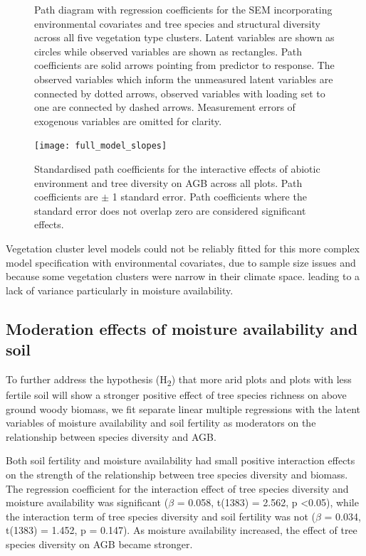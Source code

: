 \documentclass[11pt,a4paper]{article}
\begin{document}
\begin{figure}[H]
\centering
	
	\caption{Path diagram with regression coefficients for the SEM incorporating environmental covariates and tree species and structural diversity across all five vegetation type clusters. Latent variables are shown as circles while observed variables are shown as rectangles. Path coefficients are solid arrows pointing from predictor to response. The observed variables which inform the unmeasured latent variables are connected by dotted arrows, observed variables with loading set to one are connected by dashed arrows. Measurement errors of exogenous variables are omitted for clarity.}
	\label{full_mod}
\end{figure}

\begin{figure}[H]
\centering
	\texttt{[image: full\_model\_slopes]}
	\caption{Standardised path coefficients for the interactive effects of abiotic environment and tree diversity on AGB across all plots. Path coefficients are $\pm$ 1 standard error. Path coefficients where the standard error does not overlap zero are considered significant effects.}
	\label{full_model_slopes}
\end{figure}


Vegetation cluster level models could not be reliably fitted for this more complex model specification with environmental covariates, due to sample size issues and because some vegetation clusters were narrow in their climate space. leading to a lack of variance particularly in moisture availability.


\subsection{Moderation effects of moisture availability and soil}

To further address the hypothesis (H\textsubscript{2}) that more arid plots and plots with less fertile soil will show a stronger positive effect of tree species richness on above ground woody biomass, we fit separate linear multiple regressions with the latent variables of moisture availability and soil fertility as moderators on the relationship between species diversity and AGB.

Both soil fertility and moisture availability had small positive interaction effects on the strength of the relationship between tree species diversity and biomass. The regression coefficient for the interaction effect of tree species diversity and moisture availability was significant ($\beta$ = 0.058, t(1383) = 2.562, p <0.05), while the interaction term of tree species diversity and soil fertility was not ($\beta$ = 0.034, t(1383) = 1.452, p = 0.147). As moisture availability increased, the effect of tree species diversity on AGB became stronger. 
\end{document}
